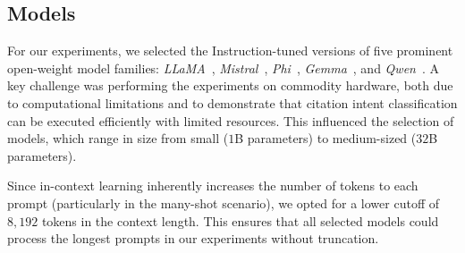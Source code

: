 

\subsection{Models}\label{sec:models}

For our experiments, we selected the Instruction-tuned versions of five prominent open-weight model families: \textit{LLaMA}~\citep{llama3}, \textit{Mistral}~\citep{mistral}, \textit{Phi}~\citep{phi3}, \textit{Gemma}~\citep{gemma2}, and \textit{Qwen}~\citep{qwen2, qwen2_5}. 
A key challenge was performing the experiments on commodity hardware, both due to computational limitations and to demonstrate that citation intent classification can be executed efficiently with limited resources. This influenced the selection of models, which range in size from small ($1$B parameters) to medium-sized ($32$B parameters).

Since in-context learning inherently increases the number of tokens to each prompt (particularly in the many-shot scenario), we opted for a lower cutoff of $8,192$ tokens in the context length. 
This ensures that all selected models could process the longest prompts in our experiments without truncation.

